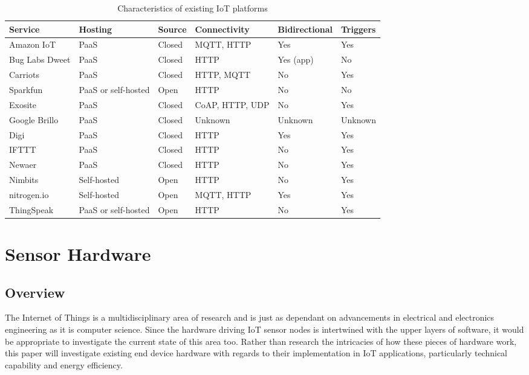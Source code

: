       \begin{table}
        \scriptsize
        \begin{tabularx}{\textwidth}{|X|X|X|X|X|X|}
          \hline
          \textbf{Service} & \textbf{Hosting} & \textbf{Source} & \textbf{Connectivity} & \textbf{Bidirectional} & \textbf{Triggers} \\ \hline
          Amazon IoT & PaaS & Closed & MQTT, HTTP & Yes & Yes \\ \hline
          Bug Labs Dweet & PaaS & Closed & HTTP & Yes (app) & No \\ \hline
          Carriots & PaaS & Closed & HTTP, MQTT & No & Yes \\ \hline
          Sparkfun & PaaS or self-hosted & Open & HTTP & No & No \\ \hline
          Exosite & PaaS & Closed & CoAP, HTTP, UDP & No & Yes \\ \hline
          Google Brillo & PaaS & Closed & Unknown & Unknown & Unknown \\ \hline
          Digi & PaaS & Closed & HTTP & Yes & Yes \\ \hline
          IFTTT & PaaS & Closed & HTTP & No & Yes \\ \hline
          Newaer & PaaS & Closed & HTTP & No & Yes \\ \hline
          Nimbits & Self-hosted & Open & HTTP & No & Yes \\ \hline
          nitrogen.io & Self-hosted & Open & MQTT, HTTP & Yes & Yes \\ \hline
          ThingSpeak & PaaS or self-hosted & Open & HTTP & No & Yes \\ \hline
        \end{tabularx}

        \caption{Characteristics of existing IoT platforms}\label{platform-characteristics}
      \end{table}
  \section{Sensor Hardware}\label{sensor-hardware}
    \subsection{Overview}
      The Internet of Things is a multidisciplinary area of research and is just as dependant on advancements in electrical and electronics engineering as it is computer science. Since the hardware driving IoT sensor nodes is intertwined with the upper layers of software, it would be appropriate to investigate the current state of this area too. Rather than research the intricacies of how these pieces of hardware work, this paper will investigate existing end device hardware with regards to their implementation in IoT applications, particularly technical capability and energy efficiency.

